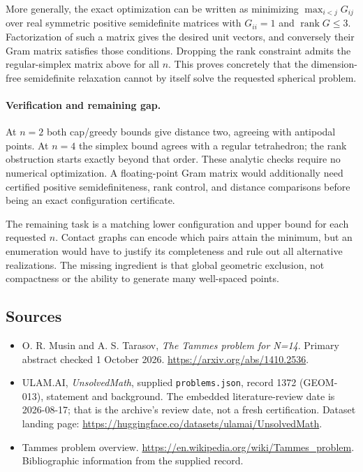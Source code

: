 \documentclass[11pt,a4paper]{article}
\begin{document}
More generally, the exact optimization can be written as minimizing $\max_{i<j}G_{ij}$ over real symmetric positive semidefinite matrices with $G_{ii}=1$ and $\operatorname{rank}G\le3$. Factorization of such a matrix gives the desired unit vectors, and conversely their Gram matrix satisfies those conditions. Dropping the rank constraint admits the regular-simplex matrix above for all $n$. This proves concretely that the dimension-free semidefinite relaxation cannot by itself solve the requested spherical problem.

\paragraph{Verification and remaining gap.}
At $n=2$ both cap/greedy bounds give distance two, agreeing with antipodal points. At $n=4$ the simplex bound agrees with a regular tetrahedron; the rank obstruction starts exactly beyond that order. These analytic checks require no numerical optimization. A floating-point Gram matrix would additionally need certified positive semidefiniteness, rank control, and distance comparisons before being an exact configuration certificate.

The remaining task is a matching lower configuration and upper bound for each requested $n$. Contact graphs can encode which pairs attain the minimum, but an enumeration would have to justify its completeness and rule out all alternative realizations. The missing ingredient is that global geometric exclusion, not compactness or the ability to generate many well-spaced points.

\subsection{Sources}

{\small

\begin{itemize}
\item[E1] O. R. Musin and A. S. Tarasov, \emph{The Tammes problem for N=14}. Primary abstract checked 1 October 2026. \url{https://arxiv.org/abs/1410.2536}.


\item[\hypertarget{source:1372:1}{S1}] ULAM.AI, \emph{UnsolvedMath}, supplied \texttt{problems.json}, record 1372 (GEOM-013), statement and background. The embedded literature-review date is 2026-08-17; that is the archive’s review date, not a fresh certification. Dataset landing page: \url{https://huggingface.co/datasets/ulamai/UnsolvedMath}.

\item[\hypertarget{source:1372:2}{S2}] Tammes problem overview. \url{https://en.wikipedia.org/wiki/Tammes_problem}. Bibliographic information from the supplied record.

\end{itemize}

}

\label{end:1372}
\end{document}
